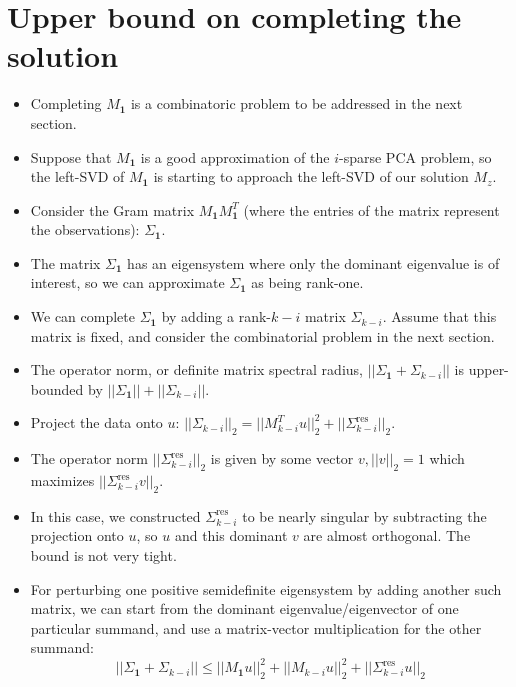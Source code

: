 \documentclass{article}
\begin{document}
\section{Upper bound on completing the solution}

\begin{itemize}
    \item Completing $M_\mathbf{1}$ is a combinatoric problem to be addressed in the next section.
    \item Suppose that $M_\mathbf{1}$ is a good approximation of the $i$-sparse PCA problem, so the left-SVD of $M_\mathbf{1}$ is starting to approach the left-SVD of our solution $M_z$.
    \item Consider the Gram matrix $M_\mathbf{1} M_\mathbf{1}^T$ (where the entries of the matrix represent the observations): $\Sigma_\mathbf{1}$.
    \item The matrix $\Sigma_\mathbf{1}$ has an eigensystem where only the dominant eigenvalue is of interest, so we can approximate $\Sigma_\mathbf{1}$ as being rank-one.
    \item We can complete $\Sigma_\mathbf{1}$ by adding a rank-$k-i$ matrix $\Sigma_{k-i}$. Assume that this matrix is fixed, and consider the combinatorial problem in the next section.
    \item The operator norm, or definite matrix spectral radius, $||\Sigma_\mathbf{1} + \Sigma_{k-i}||$ is upper-bounded by $||\Sigma_\mathbf{1}|| + ||\Sigma_{k-i}||$.
    \item Project the data onto $u$: $||\Sigma_{k-i}||_2 = ||M_{k-i}^T u||_2^2 + ||\Sigma_{k-i}^\text{res}||_2$.
    \item The operator norm $||\Sigma_{k-i}^\text{res}||_2$ is given by some vector $v, ||v||_2=1$ which maximizes $||\Sigma_{k-i}^\text{res} v||_2$.
    \item In this case, we constructed $\Sigma_{k-i}^\text{res}$ to be nearly singular by subtracting the projection onto $u$, so $u$ and this dominant $v$ are almost orthogonal. The bound is not very tight.
    \item For perturbing one positive semidefinite eigensystem by adding another such matrix, we can start from the dominant eigenvalue/eigenvector of one particular summand, and use a matrix-vector multiplication for the other summand:
    $$
        ||\Sigma_\mathbf{1} + \Sigma_{k-i}||
        \le
        ||M_\mathbf{1} u||_2^2
        +
        ||M_{k-i} u||_2^2
        +
        ||\Sigma_{k-i}^\text{res} u||_2
    $$
\end{itemize}
\end{document}
